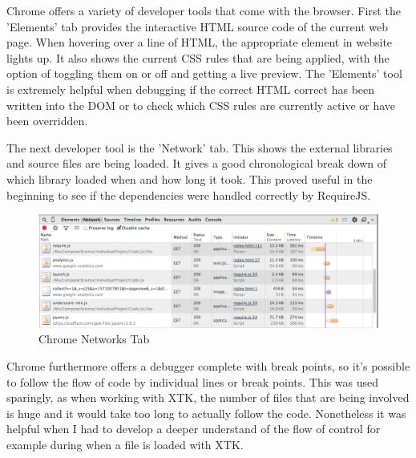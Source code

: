 \documentclass[a4paper,11pt,twoside]{article}
\begin{document}
Chrome offers a variety of developer tools that come with the browser. First the 'Elements' tab provides the interactive HTML source code of the current web page. When hovering over a line of HTML, the appropriate element in website lights up. It also shows the current CSS rules that are being applied, with the option of toggling them on or off and getting a live preview. The 'Elements' tool is extremely helpful when debugging if the correct HTML correct has been written into the DOM or to check which CSS rules are currently active or have been overridden.


The next developer tool is the 'Network' tab. This shows the external libraries and source files are being loaded. It gives a good chronological break down of which library loaded when and how long it took. This proved useful in the beginning to see if the dependencies were handled correctly by RequireJS.

\begin{figure}[ht!]
\centering
\includegraphics[width=140mm]{graphics/chromeNetwork_01.png}
\caption{Chrome Networks Tab}
\label{fig:UIdesign1}
\end{figure}


Chrome furthermore offers a debugger complete with break points, so it's possible to follow the flow of code  by individual lines or break points. This was used sparingly, as when working with XTK, the number of files that are being involved is huge and it would take too long to actually follow the code. Nonetheless it was helpful when I had to develop a deeper understand of the flow of control for example during when a file is loaded with XTK.
\end{document}
